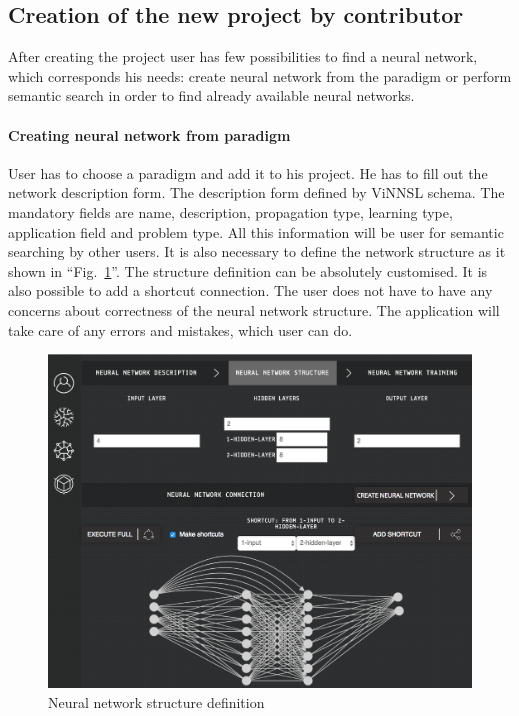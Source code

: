 \documentclass[conference]{IEEEtran}
\begin{document}
\subsection{Creation of the new project by contributor}

After creating the project user has few possibilities to find a neural network, which corresponds his needs: create neural network from the paradigm or perform semantic search in order to find already available neural networks. 

\paragraph{Creating neural network from paradigm} User has to choose a paradigm and add it to his project. He has to fill out the network description form. The description form defined by ViNNSL schema. The mandatory fields are name, description, propagation type, learning type, application field and problem type. All this information will be user for semantic searching by other users. It is also necessary to define the network structure as it shown in ``Fig.~\ref{fig:structure}''. The structure definition can be absolutely customised. It is also possible to add a shortcut connection. The user does not have to have any concerns about correctness of the neural network structure. The application will take care of any errors and mistakes, which user can do. 


\begin{figure}[H]
  \includegraphics[width=\linewidth]{structure.png}
  \caption{Neural network structure definition}
  \label{fig:structure}
\end{figure}
\end{document}

